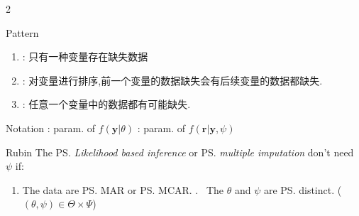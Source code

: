 \documentclass{note}
\begin{document}
\begin{multicols}{2}
{{\begin{MyTh}{Pattern}
        \begin{enumerate}
            \item {}: {\tiny 只有一种变量存在缺失数据} \qquad\qquad\quad {}
            \item {}: {\tiny 对变量进行排序,前一个变量的数据缺失会有后续变量的数据都缺失}.
            \item {}: {\tiny 任意一个变量中的数据都有可能缺失}.
        \end{enumerate}
    \end{MyTh}

    \begin{MyTh}{Notation}\tiny
        \ok{$\theta$}: param. of  $f(\mathbf{y}|\theta)$ \quad \ok{$\psi$}: param. of  $f(\mathbf{r}|\mathbf{y},\psi)$
    \end{MyTh}

    \begin{MyTh}{Rubin}
        The \ps{\textit{Likelihood based inference}} or \ps{\textit{multiple imputation}} don't need $\psi$ if:
        \begin{enumerate}
            \item The data are \ps{MAR} or \ps{MCAR}. . \ The $\theta$ and $\psi$ are \ps{distinct}. ($(\theta,\psi)\in\Theta\times\Psi$)
        \end{enumerate}
    \end{MyTh}
    }}


\end{multicols}
\end{document}
